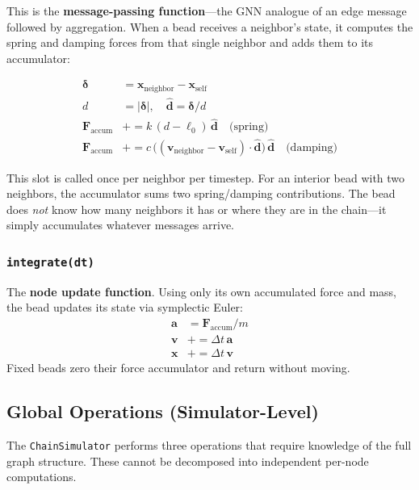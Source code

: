 \documentclass[11pt,a4paper]{article}
\begin{document}
This is the \textbf{message-passing function}---the GNN analogue of an edge
message followed by aggregation. When a bead receives a neighbor's state, it
computes the spring and damping forces from that single neighbor and adds them
to its accumulator:

\begin{align}
    \boldsymbol{\delta} &= \mathbf{x}_{\text{neighbor}} - \mathbf{x}_{\text{self}} \\
    d &= |\boldsymbol{\delta}|, \quad \hat{\mathbf{d}} = \boldsymbol{\delta}/d \\
    \mathbf{F}_{\text{accum}} &\mathrel{+}= k\,(d - \ell_0)\,\hat{\mathbf{d}}
        \quad\text{(spring)} \\
    \mathbf{F}_{\text{accum}} &\mathrel{+}= c\,\bigl((\mathbf{v}_{\text{neighbor}}
        - \mathbf{v}_{\text{self}}) \cdot \hat{\mathbf{d}}\bigr)\,\hat{\mathbf{d}}
        \quad\text{(damping)}
\end{align}

This slot is called once per neighbor per timestep. For an interior bead with
two neighbors, the accumulator sums two spring/damping contributions. The
bead does \emph{not} know how many neighbors it has or where they are in the
chain---it simply accumulates whatever messages arrive.

\subsubsection{\texttt{integrate(dt)}}
The \textbf{node update function}. Using only its own accumulated force and
mass, the bead updates its state via symplectic Euler:
\begin{align}
    \mathbf{a} &= \mathbf{F}_{\text{accum}} / m \\
    \mathbf{v} &\mathrel{+}= \Delta t \, \mathbf{a} \\
    \mathbf{x} &\mathrel{+}= \Delta t \, \mathbf{v}
\end{align}
Fixed beads zero their force accumulator and return without moving.

\subsection{Global Operations (Simulator-Level)}

The \texttt{ChainSimulator} performs three operations that require knowledge
of the full graph structure. These cannot be decomposed into independent
per-node computations.
\end{document}
